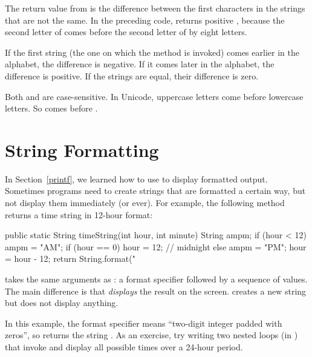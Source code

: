 The return value from  is the difference between the first characters in the strings that are not the same.
In the preceding code,  returns positive , because the second letter of  comes before the second letter of  by eight letters.

If the first string (the one on which the method is invoked) comes earlier in the alphabet, the difference is negative.
If it comes later in the alphabet, the difference is positive.
If the strings are equal, their difference is zero.


Both  and  are case-sensitive.
In Unicode, uppercase letters come before lowercase letters.
So  comes before .


\section{String Formatting}
\label{loops-strings_string-formatting}


In Section~\ref{printf}, we learned how to use  to display formatted output.
Sometimes programs need to create strings that are formatted a certain way, but not display them immediately (or ever).
For example, the following method returns a time string in 12-hour format:

\begin{code}
public static String timeString(int hour, int minute) {
    String ampm;
    if (hour < 12) {
        ampm = "AM";
        if (hour == 0) {
            hour = 12;  // midnight
        }
    } else {
        ampm = "PM";
        hour = hour - 12;
    }
    return String.format("%
}
\end{code}


 takes the same arguments as : a format specifier followed by a sequence of values.
The main difference is that  {\em displays} the result on the screen.
 creates a new string but does not display anything.

In this example, the format specifier  means ``two-digit integer padded with zeros'', so  returns the string .
As an exercise, try writing two nested  loops (in ) that invoke  and display all possible times over a 24-hour period.

